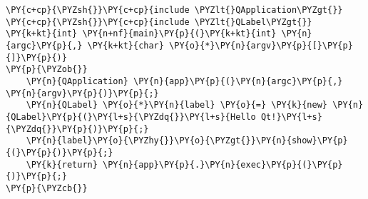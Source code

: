 \begin{Verbatim}[commandchars=\\\{\}]
\PY{c+cp}{\PYZsh{}}\PY{c+cp}{include \PYZlt{}QApplication\PYZgt{}}
\PY{c+cp}{\PYZsh{}}\PY{c+cp}{include \PYZlt{}QLabel\PYZgt{}}
\PY{k+kt}{int} \PY{n+nf}{main}\PY{p}{(}\PY{k+kt}{int} \PY{n}{argc}\PY{p}{,} \PY{k+kt}{char} \PY{o}{*}\PY{n}{argv}\PY{p}{[}\PY{p}{]}\PY{p}{)}
\PY{p}{\PYZob{}}
    \PY{n}{QApplication} \PY{n}{app}\PY{p}{(}\PY{n}{argc}\PY{p}{,} \PY{n}{argv}\PY{p}{)}\PY{p}{;}
    \PY{n}{QLabel} \PY{o}{*}\PY{n}{label} \PY{o}{=} \PY{k}{new} \PY{n}{QLabel}\PY{p}{(}\PY{l+s}{\PYZdq{}}\PY{l+s}{Hello Qt!}\PY{l+s}{\PYZdq{}}\PY{p}{)}\PY{p}{;}
    \PY{n}{label}\PY{o}{\PYZhy{}}\PY{o}{\PYZgt{}}\PY{n}{show}\PY{p}{(}\PY{p}{)}\PY{p}{;}
    \PY{k}{return} \PY{n}{app}\PY{p}{.}\PY{n}{exec}\PY{p}{(}\PY{p}{)}\PY{p}{;}
\PY{p}{\PYZcb{}}
\end{Verbatim}
